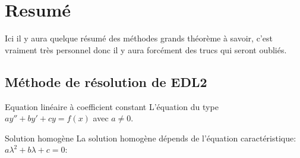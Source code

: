     \section{Resumé}
    Ici il y aura quelque résumé des méthodes grands théorème à savoir, c'est vraiment très personnel donc il y aura forcément des trucs qui seront oubliés.
    \subsection{Méthode de résolution de EDL2}
    \begin{parag}{Equation linéaire à coefficient constant}
        L'équation du type $ay'' + by' + cy = f(x)$ avec $a \neq 0$.
        \begin{subparag}{Solution homogène}
            La solution homogène dépends de l'équation caractéristique: $ a \lambda^2 + b \lambda + c = 0$:
        \end{subparag}
    
    \end{parag}
    
    
    
